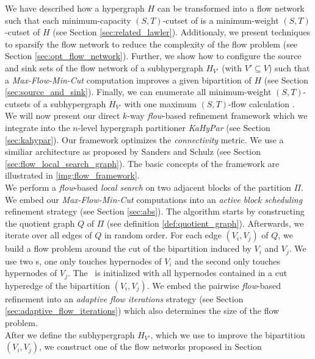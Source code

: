 We have described how a hypergraph $H$ can be transformed into
a flow network  such that each minimum-capacity $(S,T)$-cutset of  is a 
minimum-weight  $(S,T)$-cutset of $H$ (see Section \ref{sec:related_lawler}). 
Additionaly, we present techniques to sparsify the
flow network  \cite{lawler1973} to reduce the complexity of 
the flow problem (see Section \ref{sec:opt_flow_network}). 
Further, we show how to configure the source and sink sets of the flow network of a 
subhypergraph $H_{V'}$ (with $V' \subseteq V$) such that a \emph{Max-Flow-Min-Cut} 
computation improves a given bipartition of $H$ (see Section \ref{sec:source_and_sink}). 
Finally, we can enumerate all minimum-weight $(S,T)$-cutsets of a subhypergraph 
$H_{V'}$ with one maximum $(S,T)$-flow calculation \cite{picard1980structure}. \\
We will now present our direct $k$-way \emph{flow}-based refinement framework which we integrate
into the $n$-level hypergraph partitioner \emph{KaHyPar} \cite{heuer2017improving} 
(see Section \ref{sec:kahypar}). Our framework optimizes
the \emph{connectivity} metric. We use a similiar architecture as proposed
by Sanders and Schulz \cite{sanders2011engineering} (see Section 
\ref{sec:flow_local_search_graph}). The basic concepts of the framework are
illustrated in \autoref{img:flow_framework}. \\
We perform a \emph{flow}-based \emph{local search} on two adjacent blocks of
the partition $\Pi$. We embed our \emph{Max-Flow-Min-Cut} computations into an \emph{active block scheduling}
refinement strategy \cite{holtgrewe2010engineering} (see Section \ref{sec:abs}).
The algorithm starts by constructing the quotient graph $Q$ of $\Pi$ (see definition \ref{def:quotient_graph}). 
Afterwards, we iterate over all edges of $Q$ in random order. For each edge
$(V_i,V_j)$ of $Q$, we build a flow problem around the cut of the bipartition
induced by $V_i$ and $V_j$. We use two \BFS s, one only 
touches hypernodes of $V_i$ and the second only touches hypernodes of $V_j$.
The \BFS~is initialized with all hypernodes contained in a cut hyperedge
of the bipartition $(V_i,V_j)$. We embed the pairwise \emph{flow}-based refinement
into an \emph{adaptive flow iterations} strategy \cite{sanders2011engineering}
(see Section \ref{sec:adaptive_flow_iterations}) which also determines
the size of the flow problem. \\
After we define the subhypergraph $H_{V'}$, which we use to improve the bipartition
$(V_i,V_j)$, we construct one of the flow networks proposed in Section

